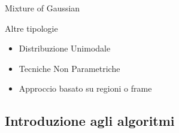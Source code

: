 {\begin{block}{Mixture of Gaussian}
\begin{itemize}
\end{itemize}
\end{block}



\begin{block}{Altre tipologie}
\begin{itemize}
 \item Distribuzione Unimodale
 \item Tecniche Non Parametriche
 \item Approccio basato su regioni o frame
\end{itemize}

\end{block}



}
\subsection{Introduzione agli algoritmi}





